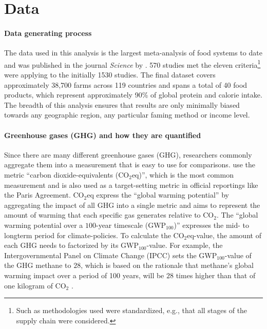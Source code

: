 \documentclass{article}
\begin{document}
\section{Data}
\label{data}
\paragraph{Data generating process} \label{dataGen}
The data used in this analysis  is the largest meta-analysis of food systems to date and was published in the journal \textit{Science} by \citet{Poore2018}.
570 studies met the eleven criteria\footnote{Such as  methodologies used were standardized, e.g., that all stages of the supply chain were considered.} \citet{Poore2018}  were applying to the initially  1530 studies.
The final dataset covers approximately 38,700 farms across 119 countries and spans a total of 40 food products, which represent approximately 90\% of global protein and calorie intake. The breadth of this analysis ensures that results are only minimally biased towards any geographic region,  any particular faming method or income level.
\paragraph*{Greenhouse gases (GHG) and how they are quantified}
Since there are many different greenhouse gases (GHG), researchers commonly aggregate them into a measurement that is easy to use for comparisons. 
\citet{Poore2018} use the metric 
``carbon dioxide-equivalents (CO$_{2}$eq)'', which is the most common measurement and is  also used as a target-setting metric in official reportings like the Paris Agreement. CO$_{2}$eq express the ``global warming potential'' by aggregating the impact of all GHG into a single metric  and  aims to represent the amount of warming that each specific gas generates relative to CO$_2$. The ``global warming potential over a $100$-year timescale (GWP$_{100}$)'' expresses the mid- to longterm period for climate-policies. To calculate the CO$_{2}$eq-value, the amount of each GHG needs to factorized by its GWP$_{100}$-value. For example, the Intergovernmental Panel on Climate Change (IPCC) sets the GWP$_{100}$-value of the GHG  methane to $28$, which is based on the rationale that methane's global warming impact over a period of 100 years, will be $28$ times higher than that of one kilogram of CO$_2$ \cite{IPCC}.
\end{document}
